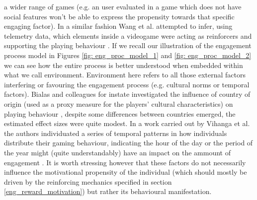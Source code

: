 a wider range of games (e.g. an user evaluated in a game which does not have social features won’t be able to express the propensity towards that specific engaging factor). In a similar fashion Wang et al. attempted to infer, using telemetry data, which elements inside a videogame were acting as reinforcers and supporting the playing behaviour \cite{wang2018beyond}. If we recall our illustration of the engagement process model in Figures \ref{fig: eng_proc_model_1} and \ref{fig: eng_proc_model_2} we can see how the entire process is better understood when embedded within what we call environment. Environment here refers to all those external factors interfering or favouring the engagement process (e.g. cultural norms or temporal factors). Bialas and colleagues for instate investigated the influence of country of origin (used as a proxy measure for the players’ cultural characteristics) on playing behaviour \cite{bialas2014cultural}, despite some differences between countries emerged, the estimated effect sizes were quite modest. In a work carried out by Vihanga et al. the authors individuated a series of temporal patterns in how individuals distribute their gaming behaviour, indicating the hour of the day or the period of the year might (quite understandably) have an impact on the ammount of engagement \cite{vihanga2019weekly}. It is worth stressing however that these factors do not necessarily influence the motivational propensity of the individual (which should mostly be driven by the reinforcing mechanics specified in section \ref{eng_reward_motivation}) but rather its behavioural manifestation.

